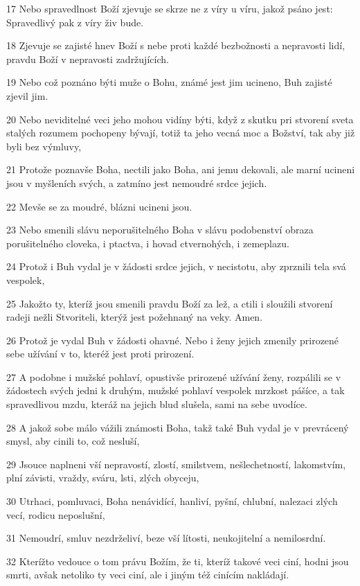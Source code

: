 \par 17 Nebo spravedlnost Boží zjevuje se skrze ne z víry u víru, jakož psáno jest: Spravedlivý pak z víry živ bude.
\par 18 Zjevuje se zajisté hnev Boží s nebe proti každé bezbožnosti a nepravosti lidí, pravdu Boží v nepravosti zadržujících.
\par 19 Nebo což poznáno býti muže o Bohu, známé jest jim ucineno, Buh zajisté zjevil jim.
\par 20 Nebo neviditelné veci jeho mohou vidíny býti, když z skutku pri stvorení sveta stalých rozumem pochopeny bývají, totiž ta jeho vecná moc a Božství, tak aby již byli bez výmluvy,
\par 21 Protože poznavše Boha, nectili jako Boha, ani jemu dekovali, ale marní ucineni jsou v myšleních svých, a zatmíno jest nemoudré srdce jejich.
\par 22 Mevše se za moudré, blázni ucineni jsou.
\par 23 Nebo smenili slávu neporušitelného Boha v slávu podobenství obraza porušitelného cloveka, i ptactva, i hovad ctvernohých, i zemeplazu.
\par 24 Protož i Buh vydal je v žádosti srdce jejich, v necistotu, aby zprznili tela svá vespolek,
\par 25 Jakožto ty, kteríž jsou smenili pravdu Boží za lež, a ctili i sloužili stvorení radeji nežli Stvoriteli, kterýž jest požehnaný na veky. Amen.
\par 26 Protož je vydal Buh v žádosti ohavné. Nebo i ženy jejich zmenily prirozené sebe užívání v to, kteréž jest proti prirození.
\par 27 A podobne i mužské pohlaví, opustivše prirozené užívání ženy, rozpálili se v žádostech svých jedni k druhým, mužské pohlaví vespolek mrzkost pášíce, a tak spravedlivou mzdu, kteráž na jejich blud slušela, sami na sebe uvodíce.
\par 28 A jakož sobe málo vážili známosti Boha, takž také Buh vydal je v prevrácený smysl, aby cinili to, což nesluší,
\par 29 Jsouce naplneni vší nepravostí, zlostí, smilstvem, nešlechetností, lakomstvím, plní závisti, vraždy, sváru, lsti, zlých obyceju,
\par 30 Utrhaci, pomluvaci, Boha nenávidící, hanliví, pyšní, chlubní, nalezaci zlých vecí, rodicu neposlušní,
\par 31 Nemoudrí, smluv nezdrželiví, beze vší lítosti, neukojitelní a nemilosrdní.
\par 32 Kterížto vedouce o tom právu Božím, že ti, kteríž takové veci ciní, hodni jsou smrti, avšak netoliko ty veci ciní, ale i jiným též cinícím nakládají.

